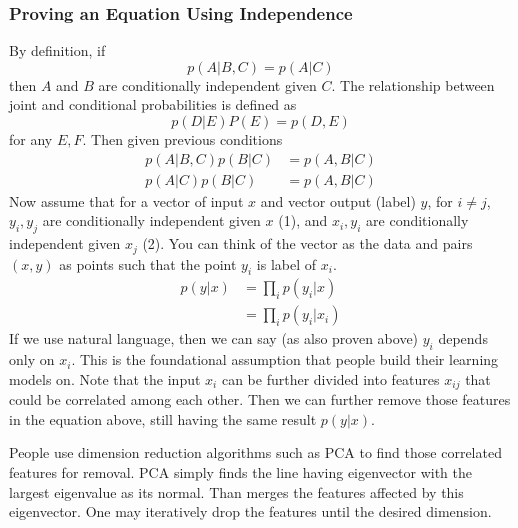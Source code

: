 \documentclass{article}
\numberwithin{equation}{subsection}
\begin{document}
\subsubsection{Proving an Equation Using Independence}
By definition, if
\begin{equation}
    p(A|B,C) = p(A|C) \label{cond_prob}
\end{equation}
then $A$ and $B$ are conditionally independent given $C$. The relationship between joint and conditional probabilities is defined as 
\begin{equation}
    p(D|E)P(E) = p(D,E) \label{joint_cond_prob}
\end{equation}
for any $E, F$. Then given previous conditions
\begin{align}
    p(A|B,C)p(B|C) &= p(A,B|C)\\
    p(A|C)p(B|C) &= p(A,B|C)
\end{align}
Now assume that for a vector of input $x$ and vector output (label) $y$, for $i \neq j$, $y_i, y_j$ are conditionally independent given $x$ (1), and $x_i, y_i$ are conditionally independent given $x_j$ (2). You can think of the vector as the data and pairs $(x,y)$ as points such that the point $y_i$ is label of $x_i$.
\begin{align}
    p(y|x) &= \prod_i p(y_i|x)\\
           &= \prod_i p(y_i|x_i)
\end{align}
If we use natural language, then we can say (as also proven above) $y_i$ depends only on $x_i$. This is the foundational assumption that people build their learning models on. Note that the input $x_i$ can be further divided into features $x_{ij}$ that could be correlated among each other. Then we can further remove those features in the equation above, still having the same result $p(y|x)$. 

People use dimension reduction algorithms such as PCA to find those correlated features for removal. PCA simply finds the line having eigenvector with the largest eigenvalue as its normal. Than merges the features affected by this eigenvector. One may iteratively drop the features until the desired dimension.
\end{document}
